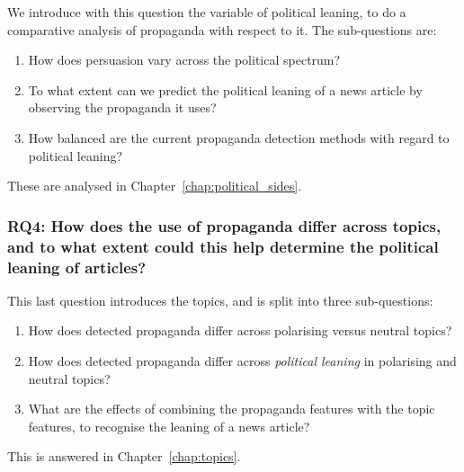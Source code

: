 We introduce with this question the variable of political leaning, to do a comparative analysis of propaganda with respect to it. The sub-questions are:

\begin{enumerate}[label={\textbf{RQ3.\arabic*:}},leftmargin=2cm]
    \item How does persuasion vary across the political spectrum?
    \item To what extent can we predict the political leaning of a news article by observing the propaganda it uses?
    \item How balanced are the current propaganda detection methods with regard to political leaning?
\end{enumerate}

These are analysed in Chapter~\ref{chap:political_sides}.

\subsubsection*{RQ4: How does the use of propaganda differ across topics, and to what extent could this help determine the political leaning of articles?}

This last question introduces the topics, and is split into three sub-questions:

\begin{enumerate}[label={\textbf{RQ4.\arabic*:}},leftmargin=2cm]
    \item How does detected propaganda differ across polarising versus neutral topics?
    \item How does detected propaganda differ across \emph{political leaning} in polarising and neutral topics?
    \item What are the effects of combining the propaganda features with the topic features, to recognise the leaning of a news article?
\end{enumerate}

This is answered in Chapter~\ref{chap:topics}.






